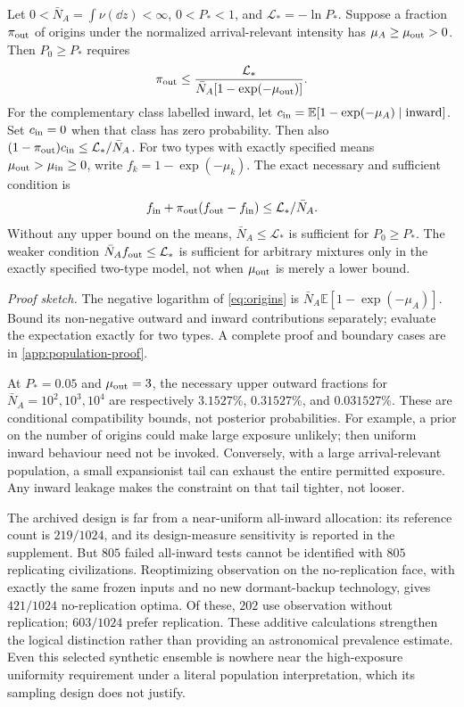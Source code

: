 \begin{proposition}
\label{prop:uniformity}
Let $0<\bar N_A=\int\nu(\dd z)<\infty$, $0<P_*<1$, and
$\mathcal L_*=-\ln P_*$. Suppose a fraction $\pi_{\rm out}$ of origins under the
normalized arrival-relevant intensity has $\mu_A\geq\mu_{\rm out}>0$.
Then $P_0\geq P_*$ requires
\begin{equation}
 \pi_{\rm out}\leq
 \frac{\mathcal L_*}{\bar N_A[1-\exp(-\mu_{\rm out})]}.
 \label{eq:uniformity-bound}
\end{equation}
For the complementary class labelled inward, let $c_{\rm in}=\mathbb E[1-\exp(-\mu_A)\mid\text{inward}]$.
Set $c_{\rm in}=0$ when that class has zero probability. Then also $(1-\pi_{\rm out})c_{\rm in}\leq \mathcal L_*/\bar N_A$.
For two types with exactly specified means
$\mu_{\rm out}>\mu_{\rm in}\geq0$, write
$f_k=1-\exp(-\mu_k)$. The exact necessary and sufficient condition is
\begin{equation}
 f_{\rm in}+\pi_{\rm out}(f_{\rm out}-f_{\rm in})
 \leq \mathcal L_*/\bar N_A.
 \label{eq:two-type-window}
\end{equation}
Without any upper bound on the means, $\bar N_A\leq \mathcal L_*$ is sufficient
for $P_0\geq P_*$. The weaker condition
$\bar N_Af_{\rm out}\leq \mathcal L_*$ is sufficient for arbitrary mixtures only
in the exactly specified two-type model, not when $\mu_{\rm out}$ is
merely a lower bound.
\end{proposition}
\noindent\emph{Proof sketch.}
The negative logarithm of \cref{eq:origins} is
$\bar N_A\mathbb E[1-\exp(-\mu_A)]$. Bound its non-negative outward
and inward contributions separately; evaluate the expectation exactly
for two types. A complete proof and boundary cases are in
\cref{app:population-proof}.

At $P_*=0.05$ and $\mu_{\rm out}=3$, the necessary upper outward
fractions for $\bar N_A=10^2,10^3,10^4$ are respectively
$3.1527\%$, $0.31527\%$, and $0.031527\%$. These are conditional
compatibility bounds, not posterior probabilities. For example, a prior
on the number of origins could make large exposure unlikely; then
uniform inward behaviour need not be invoked. Conversely, with a large
arrival-relevant population, a small expansionist tail can exhaust the
entire permitted exposure. Any inward leakage makes the constraint on
that tail tighter, not looser.

The archived design is far from a near-uniform all-inward allocation:
its reference count is $219/1024$, and its design-measure sensitivity is
reported in the supplement. But $805$ failed all-inward tests cannot be
identified with $805$ replicating civilizations. Reoptimizing observation
on the no-replication face, with exactly the same frozen inputs and no
new dormant-backup technology, gives $421/1024$ no-replication optima.
Of these, $202$ use observation without replication; $603/1024$ prefer
replication. These additive calculations strengthen the logical
distinction rather than providing an astronomical prevalence estimate.
Even this selected synthetic ensemble is nowhere near the high-exposure
uniformity requirement under a literal population interpretation, which
its sampling design does not justify.

